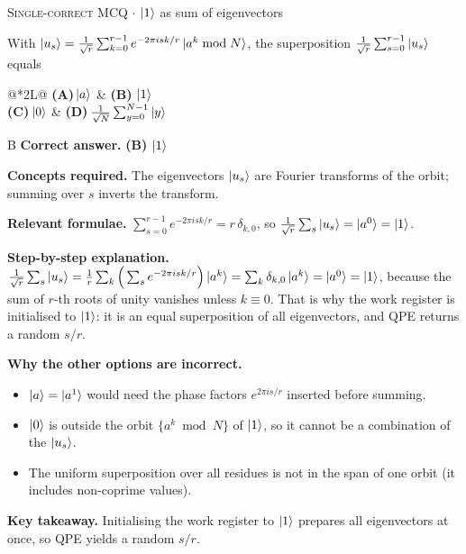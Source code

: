 \documentclass[11pt,a4paper]{article}
\newcommand{\optlabel}[1]{\textbf{(#1)}}
\newcommand{\correctlabel}[1]{\textcolor{okgreen}{\textbf{(#1)}\,\ding{51}}}
\newenvironment{qitem}[1]{\begin{list}{}{\setlength{\leftmargin}{3.3em}\setlength{\labelwidth}{3.1em}%
  \setlength{\labelsep}{0.2em}\setlength{\topsep}{3pt}\setlength{\parsep}{3pt}}\item[\textbf{Q.#1}\hfill]}{\end{list}}
\newcommand{\qsep}{\par\vspace{2pt}{\color{black!15}\hrule}\vspace{4pt}}
\newcommand{\qmeta}[2]{{\footnotesize\color{black!60}\textsc{#1} \;$\cdot$\; #2}\par}
\begin{document}
\begin{qitem}{25}
\qmeta{Single-correct MCQ}{$\ket1$ as sum of eigenvectors}
With $\ket{u_s} = \frac{1}{\sqrt r}\sum_{k=0}^{r-1}e^{-2\pi isk/r}\ket{a^k \bmod N}$, the superposition $\frac{1}{\sqrt r}\sum_{s=0}^{r-1}\ket{u_s}$ equals
\par\smallskip\noindent\begin{tabularx}{\linewidth}{@{}*{2}{L}@{}}
\optlabel{A}\,$\ket a$ & \correctlabel{B}\,$\ket1$ \\[3pt]
\optlabel{C}\,$\ket0$ & \optlabel{D}\,$\frac{1}{\sqrt N}\sum_{y=0}^{N-1}\ket y$
\end{tabularx}
\end{qitem}
\begin{solbox}{B}
\textbf{\color{brand}Correct answer.} \textcolor{okgreen}{\textbf{(B)}} $\ket1$

\textbf{\color{brand}Concepts required.} The eigenvectors $\ket{u_s}$ are Fourier transforms of the orbit; summing over $s$ inverts the transform.

\textbf{\color{brand}Relevant formulae.} $\sum_{s=0}^{r-1}e^{-2\pi isk/r} = r\,\delta_{k,0}$, so $\frac{1}{\sqrt r}\sum_s\ket{u_s} = \ket{a^0} = \ket1$.

\textbf{\color{brand}Step-by-step explanation.} $\frac{1}{\sqrt r}\sum_s\ket{u_s} = \frac1r\sum_k\Big(\sum_se^{-2\pi isk/r}\Big)\ket{a^k} = \sum_k\delta_{k,0}\ket{a^k} = \ket{a^0} = \ket1$, because the sum of
$r$-th roots of unity vanishes unless $k \equiv 0$. That is why the work register is initialised to $\ket1$: it is an equal superposition of all eigenvectors,
and QPE returns a random $s/r$.

\textbf{\color{brand}Why the other options are incorrect.}
\begin{itemize}[leftmargin=2.4em, itemsep=1pt, topsep=2pt]
\item[\textbf{(A)}] $\ket a = \ket{a^1}$ would need the phase factors $e^{2\pi is/r}$ inserted before summing.
\item[\textbf{(C)}] $\ket0$ is outside the orbit $\{a^k \bmod N\}$ of $\ket1$, so it cannot be a combination of the $\ket{u_s}$.
\item[\textbf{(D)}] The uniform superposition over all residues is not in the span of one orbit (it includes non-coprime values).
\end{itemize}
\textbf{\color{brand}Key takeaway.} Initialising the work register to $\ket1$ prepares all eigenvectors at once, so QPE yields a random $s/r$.
\end{solbox}
\qsep
\end{document}
